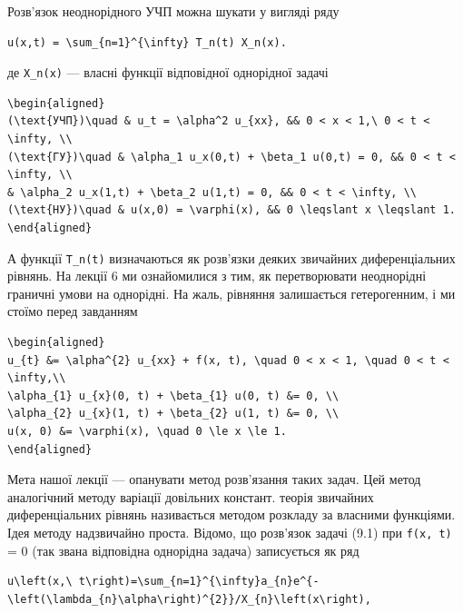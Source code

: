 \documentclass[
  ukrainian,
]{article}
\begin{document}
Розв'язок неоднорідного УЧП можна шукати у вигляді ряду

\begin{verbatim}
u(x,t) = \sum_{n=1}^{\infty} T_n(t) X_n(x).
\end{verbatim}

де \texttt{X\_n(x)} --- власні функції відповідної однорідної задачі

\begin{verbatim}
\begin{aligned}
(\text{УЧП})\quad & u_t = \alpha^2 u_{xx}, && 0 < x < 1,\ 0 < t < \infty, \\
(\text{ГУ})\quad & \alpha_1 u_x(0,t) + \beta_1 u(0,t) = 0, && 0 < t < \infty, \\
& \alpha_2 u_x(1,t) + \beta_2 u(1,t) = 0, && 0 < t < \infty, \\
(\text{НУ})\quad & u(x,0) = \varphi(x), && 0 \leqslant x \leqslant 1.
\end{aligned}
\end{verbatim}

А функції \texttt{T\_n(t)} визначаються як розв'язки деяких звичайних
диференціальних рівнянь. На лекції 6 ми ознайомилися з тим, як
перетворювати неоднорідні граничні умови на однорідні. На жаль, рівняння
залишається гетерогенним, і ми стоїмо перед завданням

\begin{verbatim}
\begin{aligned}
u_{t} &= \alpha^{2} u_{xx} + f(x, t), \quad 0 < x < 1, \quad 0 < t < \infty,\\
\alpha_{1} u_{x}(0, t) + \beta_{1} u(0, t) &= 0, \\
\alpha_{2} u_{x}(1, t) + \beta_{2} u(1, t) &= 0, \\
u(x, 0) &= \varphi(x), \quad 0 \le x \le 1.
\end{aligned}
\end{verbatim}

Мета нашої лекції --- опанувати метод розв'язання таких задач. Цей метод
аналогічний методу варіації довільних констант. теорія звичайних
диференціальних рівнянь називається методом розкладу за власними
функціями. Ідея методу надзвичайно проста. Відомо, що розв'язок задачі
(9.1) при \texttt{f(x,\ t)} = 0 (так звана відповідна однорідна задача)
записується як ряд

\begin{verbatim}
u\left(x,\ t\right)=\sum_{n=1}^{\infty}a_{n}e^{-\left(\lambda_{n}\alpha\right)^{2}}/X_{n}\left(x\right),
\end{verbatim}
\end{document}

